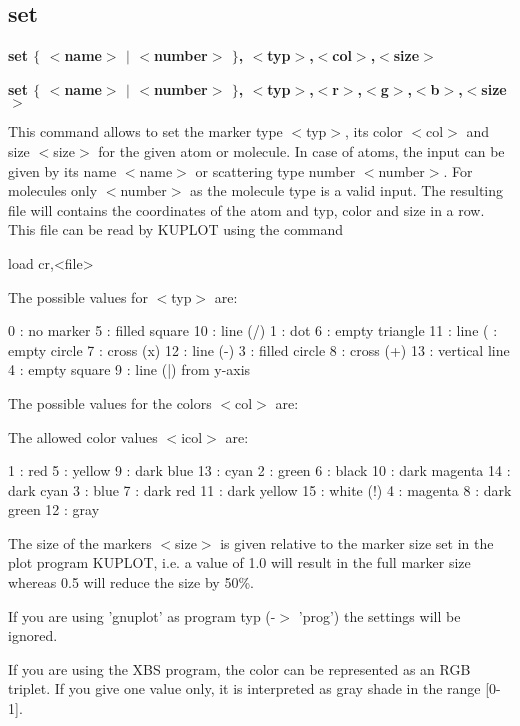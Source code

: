 \subsection*{set}
{\bf set $ \{$ $ <$name$> $ $| $ $ <$number$> $ $\} $, $ <$typ$> $,$ <$col$> $,$ <$size$> $ \par }
{\bf set $ \{$ $ <$name$> $ $| $ $ <$number$> $ $\} $, $ <$typ$> $,$ <$r$> $,$ <$g$> $,$ <$b$> $,$ <$size$> $ \par }
\par
\vspace{3pt}
This command allows to set the marker type $ <$typ$> $, its color $ <$col$> $ 
and size $ <$size$> $ for the given atom or molecule. In case of atoms, 
the input can be given by its name $ <$name$> $ or scattering type number 
$ <$number$> $. For molecules only $ <$number$> $ as the molecule type is a valid 
input. The resulting file will contains the coordinates of the atom 
and typ, color and size in a row. This file can be read by KUPLOT 
using the command 
\par
\begin{MacVerbatim}
   load cr,<file>
\end{MacVerbatim}
The possible values for $ <$typ$> $ are: 
\par
\begin{MacVerbatim}
  0 : no marker       5 : filled square    10 : line (/)
  1 : dot             6 : empty triangle   11 : line ( : empty circle    7 : cross (x)        12 : line (-)
  3 : filled circle   8 : cross (+)        13 : vertical line
  4 : empty square    9 : line (|)              from y-axis
\end{MacVerbatim}
The possible values for the colors $ <$col$> $ are: 
\par
The allowed color values $ <$icol$> $ are: 
\par
\begin{MacVerbatim}
  1 : red       5 : yellow        9 : dark blue      13 : cyan
  2 : green     6 : black        10 : dark magenta   14 : dark cyan
  3 : blue      7 : dark red     11 : dark yellow    15 : white (!)
  4 : magenta   8 : dark green   12 : gray
\end{MacVerbatim}
The size of the markers $ <$size$> $ is given relative to the marker 
size set in the plot program KUPLOT, i.e. a value of 1.0 will 
result in the full marker size whereas 0.5 will reduce the size 
by 50\%. 
\par
If you are using 'gnuplot' as program typ (-$> $ 'prog') the settings 
will be ignored. 
\par
If you are using the XBS program, the color can be represented 
as an RGB triplet. If you give one value only, it is interpreted 
as gray shade in the range [0-1]. 
